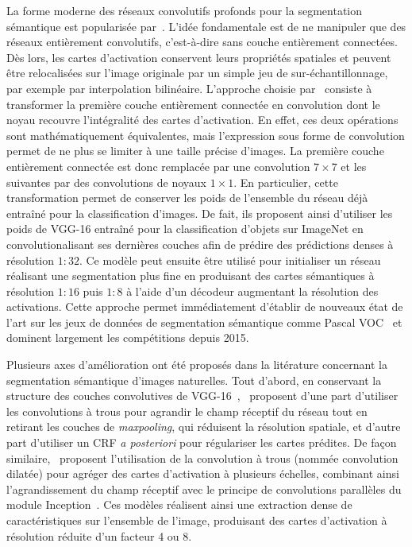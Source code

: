 La forme moderne des réseaux convolutifs profonds pour la segmentation sémantique est popularisée par~\citet{long_fully_2015}. L'idée fondamentale est de ne manipuler que des réseaux entièrement convolutifs, c'est-à-dire sans couche entièrement connectées. Dès lors, les cartes d'activation conservent leurs propriétés spatiales et peuvent être relocalisées sur l'image originale par un simple jeu de sur-échantillonnage, par exemple par interpolation bilinéaire. L'approche choisie par~\citet{long_fully_2015} consiste à transformer la première couche entièrement connectée en convolution dont le noyau recouvre l'intégralité des cartes d'activation. En effet, ces deux opérations sont mathématiquement équivalentes, mais l'expression sous forme de convolution permet de ne plus se limiter à une taille précise d'images. La première couche entièrement connectée est donc remplacée par une convolution $7\times7$ et les suivantes par des convolutions de noyaux $1\times1$. En particulier, cette transformation permet de conserver les poids de l'ensemble du réseau déjà entraîné pour la classification d'images. De fait, ils proposent ainsi d'utiliser les poids de VGG-16 entraîné pour la classification d'objets sur ImageNet en convolutionalisant ses dernières couches afin de prédire des prédictions denses à résolution $1:32$. Ce modèle peut ensuite être utilisé pour initialiser un réseau réalisant une segmentation plus fine en produisant des cartes sémantiques à résolution $1:16$ puis $1:8$ à l'aide d'un décodeur augmentant la résolution des activations. Cette approche permet immédiatement d'établir de nouveaux état de l'art sur les jeux de données de segmentation sémantique comme Pascal VOC~\cite{everingham_pascal_2014} et dominent largement les compétitions depuis 2015.

Plusieurs axes d'amélioration ont été proposés dans la litérature concernant la segmentation sémantique d'images naturelles. Tout d'abord, en conservant la structure des couches convolutives de VGG-16~\cite{simonyan_very_2014},~\citet{l._c._chen_deeplab_2018} proposent d'une part d'utiliser les convolutions à trous pour agrandir le champ réceptif du réseau tout en retirant les couches de \emph{maxpooling}, qui réduisent la résolution spatiale, et d'autre part d'utiliser un \gls{CRF} \emph{a posteriori} pour régulariser les cartes prédites. De façon similaire,~\citet{yu_multi-scale_2015} proposent l'utilisation de la convolution à trous (nommée convolution dilatée) pour agréger des cartes d'activation à plusieurs échelles, combinant ainsi l'agrandissement du champ réceptif avec le principe de convolutions parallèles du module Inception~\cite{szegedy_going_2015}. Ces modèles réalisent ainsi une extraction dense de caractéristiques sur l'ensemble de l'image, produisant des cartes d'activation à résolution réduite d'un facteur 4 ou 8.

